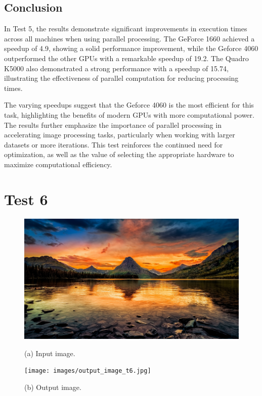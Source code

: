 \subsection{Conclusion}        
In Test 5, the results demonstrate significant improvements in execution times across all machines when using parallel processing. The GeForce 1660 achieved a speedup of 4.9, showing a solid performance improvement, while the Geforce 4060 outperformed the other GPUs with a remarkable speedup of 19.2. The Quadro K5000 also demonstrated a strong performance with a speedup of 15.74, illustrating the effectiveness of parallel computation for reducing processing times.

The varying speedups suggest that the Geforce 4060 is the most efficient for this task, highlighting the benefits of modern GPUs with more computational power. The results further emphasize the importance of parallel processing in accelerating image processing tasks, particularly when working with larger datasets or more iterations. This test reinforces the continued need for optimization, as well as the value of selecting the appropriate hardware to maximize computational efficiency.

\section{Test 6}
\begin{figure}[H]
    \centering
    \begin{minipage}[b]{0.45\textwidth}
        \centering
        \includegraphics[width=\textwidth]{images/input_image_t6.jpg}
        \caption{(a) Input image.}
        \label{fig:test_6_input}
    \end{minipage}
    \hfill
    \begin{minipage}[b]{0.45\textwidth}
        \centering
        \texttt{[image: images/output\_image\_t6.jpg]}
        \caption{(b) Output image.}
        \label{fig:test_6_output}
    \end{minipage}
    \end{figure}

